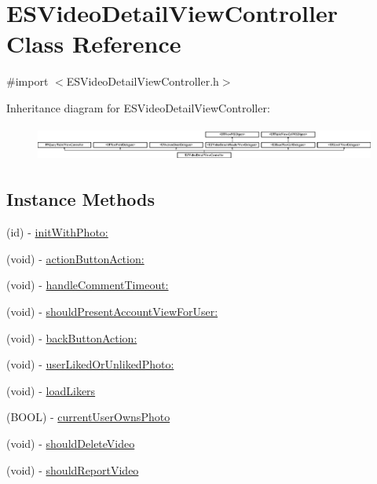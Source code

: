 \hypertarget{interface_e_s_video_detail_view_controller}{}\section{E\+S\+Video\+Detail\+View\+Controller Class Reference}
\label{interface_e_s_video_detail_view_controller}


{\ttfamily \#import $<$E\+S\+Video\+Detail\+View\+Controller.\+h$>$}

Inheritance diagram for E\+S\+Video\+Detail\+View\+Controller\+:\begin{figure}[H]
\begin{center}
\leavevmode
\includegraphics[height=1.161826cm]{interface_e_s_video_detail_view_controller}
\end{center}
\end{figure}
\subsection*{Instance Methods}
\begin{DoxyCompactItemize}
\item 
(id) -\/ \hyperlink{interface_e_s_video_detail_view_controller_a0cc5ce1efbead194f654a2713bbe0246}{init\+With\+Photo\+:}
\item 
(void) -\/ \hyperlink{interface_e_s_video_detail_view_controller_ac238ed02fc23e01553dbe206b6a526fb}{action\+Button\+Action\+:}
\item 
(void) -\/ \hyperlink{interface_e_s_video_detail_view_controller_a2f69187831a684574a6eeb36deb602cd}{handle\+Comment\+Timeout\+:}
\item 
(void) -\/ \hyperlink{interface_e_s_video_detail_view_controller_a56ed09f80407f4699b7da1b7eda9083b}{should\+Present\+Account\+View\+For\+User\+:}
\item 
(void) -\/ \hyperlink{interface_e_s_video_detail_view_controller_a05f424273ef250dc682f5af201e39fba}{back\+Button\+Action\+:}
\item 
(void) -\/ \hyperlink{interface_e_s_video_detail_view_controller_aa9f6108466216b5960b91cfebc849c3e}{user\+Liked\+Or\+Unliked\+Photo\+:}
\item 
(void) -\/ \hyperlink{interface_e_s_video_detail_view_controller_a2f73ba9dcd28e6351c5c633bf8f22858}{load\+Likers}
\item 
(B\+O\+O\+L) -\/ \hyperlink{interface_e_s_video_detail_view_controller_a5c153261e86658b9e7b7d3e68ee65e77}{current\+User\+Owns\+Photo}
\item 
(void) -\/ \hyperlink{interface_e_s_video_detail_view_controller_a2d0d60f9602ae576b6e43b2a2b2edde0}{should\+Delete\+Video}
\item 
(void) -\/ \hyperlink{interface_e_s_video_detail_view_controller_a7a26fb1401773d7b2bfd08459aa0ee0f}{should\+Report\+Video}
\end{DoxyCompactItemize}
